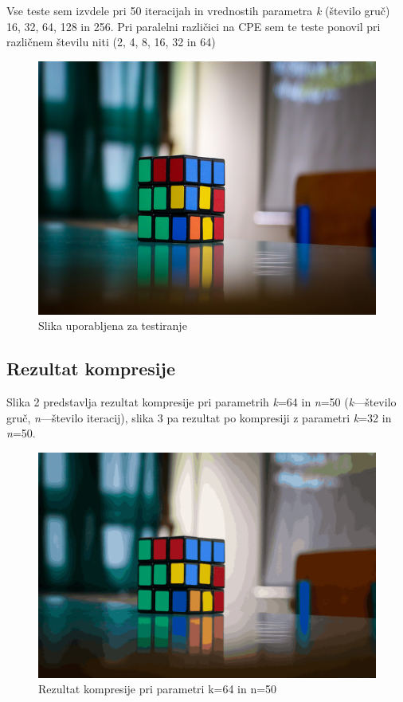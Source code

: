 \documentclass[11pt]{article}
\begin{document}
\bigskip\noindent
Vse teste sem izvdele pri 50 iteracijah in vrednostih parametra \emph{k} (število gruč) 16, 32, 64, 128 in 256.
Pri paralelni različici na CPE sem te teste ponovil pri različnem številu niti (2, 4, 8, 16, 32 in 64)

\bigskip\noindent


\begin{figure}[H]
    \includegraphics[scale=0.4]{cube_640x480}
    \centering
    \caption{Slika uporabljena za testiranje}
\end{figure}



\subsection{Rezultat kompresije}
Slika 2 predstavlja rezultat kompresije pri parametrih \emph{k}=64 in \emph{n}=50 (\emph{k}—število gruč, \emph{n}—število iteracij), slika 3 pa rezultat po kompresiji z parametri \emph{k}=32 in \emph{n}=50.

\begin{figure}[H]
    \includegraphics[scale=0.2]{out_64}
    \centering
    \caption{Rezultat kompresije pri parametri k=64 in n=50}
\end{figure}
\end{document}
